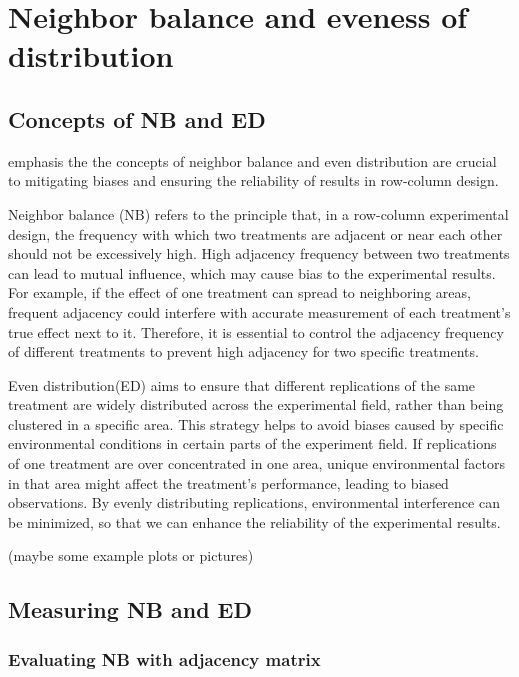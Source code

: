 \documentclass[
  a4paper,
  oneside,
  openany,
  12pt,
  onecolumn]{book}
\theoremstyle{plain}
\theoremstyle{definition}
\theoremstyle{remark}
\begin{document}
\section{Neighbor balance and eveness of
distribution}\label{neighbor-balance-and-eveness-of-distribution}

\subsection{Concepts of NB and ED}\label{concepts-of-nb-and-ed}

\citet{piepho2018neighbor} emphasis the the concepts of neighbor balance
and even distribution are crucial to mitigating biases and ensuring the
reliability of results in row-column design.

Neighbor balance (NB) refers to the principle that, in a row-column
experimental design, the frequency with which two treatments are
adjacent or near each other should not be excessively high. High
adjacency frequency between two treatments can lead to mutual influence,
which may cause bias to the experimental results. For example, if the
effect of one treatment can spread to neighboring areas, frequent
adjacency could interfere with accurate measurement of each treatment's
true effect next to it. Therefore, it is essential to control the
adjacency frequency of different treatments to prevent high adjacency
for two specific treatments.

Even distribution(ED) aims to ensure that different replications of the
same treatment are widely distributed across the experimental field,
rather than being clustered in a specific area. This strategy helps to
avoid biases caused by specific environmental conditions in certain
parts of the experiment field. If replications of one treatment are over
concentrated in one area, unique environmental factors in that area
might affect the treatment's performance, leading to biased
observations. By evenly distributing replications, environmental
interference can be minimized, so that we can enhance the reliability of
the experimental results.

(maybe some example plots or pictures)

\subsection{Measuring NB and ED}\label{measuring-nb-and-ed}

\subsubsection{Evaluating NB with adjacency
matrix}\label{evaluating-nb-with-adjacency-matrix}
\end{document}
